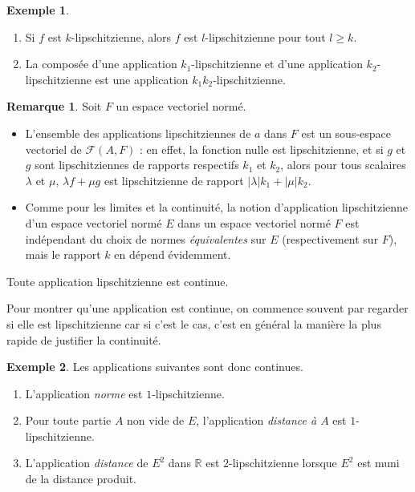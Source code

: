 \documentclass[french]{article}
\newcommand{\R}{\mathbb{R}}
\theoremstyle{plain}
\theoremstyle{definition}
\newtheorem*{ex}{Exemple}
\newtheorem*{rmq}{Remarque}
\theoremstyle{remark}
\begin{document}
\begin{ex}
	\begin{enumerate}
		\item Si $f$ est $k$-lipschitzienne, alors $f$ est $l$-lipschitzienne pour tout $l\geqslant k$.
		\item La composée d'une application $k_1$-lipschitzienne et d'une application $k_2$-lipschitzienne est une application $k_1k_2$-lipschitzienne.
	\end{enumerate}
\end{ex}

\begin{rmq}
	Soit $F$ un espace vectoriel normé.
	\begin{itemize}
		\item L'ensemble des applications lipschitziennes de $a$ dans $F$ est un sous-espace vectoriel de $\mathcal{F}(A,F)$ : en effet, la fonction nulle est lipschitzienne, et si $g$ et $g$ sont lipschitziennes de rapports respectifs $k_1$ et $k_2$, alors pour tous scalaires $\lambda$ et $\mu$, $\lambda f+\mu g$ est lipschitzienne de rapport $\lvert\lambda\rvert k_1+\lvert\mu\rvert k_2$.
		\item Comme pour les limites et la continuité, la notion d'application lipschitzienne d'un espace vectoriel normé $E$ dans un espace vectoriel normé $F$ est indépendant du choix de normes \textit{équivalentes} sur $E$ (respectivement sur $F$), mais le rapport $k$ en dépend évidemment.
	\end{itemize}
\end{rmq}

\begin{prop}%
	Toute application lipschitzienne est continue.
\end{prop}

\begin{met}
	Pour montrer qu'une application est continue, on commence souvent par regarder si elle est lipschitzienne car si c'est le cas, c'est en général la manière la plus rapide de justifier la continuité.
\end{met}

\begin{ex}
	Les applications suivantes sont donc continues.
	\begin{enumerate}
		\item L'application \textit{norme} est $1$-lipschitzienne.
		\item Pour toute partie $A$ non vide de $E$, l'application \textit{distance à $A$} est $1$-lipschitzienne.
		\item L'application \textit{distance} de $E^2$ dans $\R$ est $2$-lipschitzienne lorsque $E^2$ est muni de la distance produit.
	\end{enumerate}
\end{ex}
\end{document}
